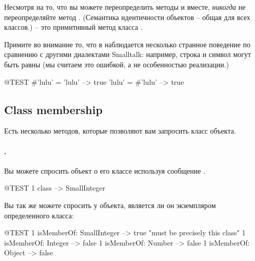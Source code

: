 \documentclass[a4paper,10pt,twoside]{book}
\begin{document}
Несмотря на то, что вы можете переопределить методы \ct{=} и  вместе, \emph{никогда} не переопределяйте метод \ct{==}. (Семантика идентичности объектов -- общая для всех классов.) \ct{==} -- это примитивный метод класса .

Примите во внимание то, что в \pharo наблюдается несколько странное поведение по сравнению с другими диалектами Smalltalk: например, строка и символ могут быть равны (мы считаем это ошибкой, а не особенностью реализации.)


\begin{code}{@TEST}
#'lulu' = 'lulu' --> true
'lulu' = #'lulu' --> true
\end{code}


\subsection{Class membership}
Есть несколько методов, которые позволяют вам запросить класс объекта.

\paragraph{.} Вы можете спросить объект о его классе используя сообщение .
\begin{code}{@TEST}
1 class --> SmallInteger
\end{code}

Вы так же можете спросить у объекта, является ли он экземпляром определенного класса:
\begin{code}{@TEST}
1 isMemberOf: SmallInteger --> true    "must be precisely this class"
1 isMemberOf: Integer          --> false
1 isMemberOf: Number        --> false
1 isMemberOf: Object           --> false
\end{code}
\end{document}
